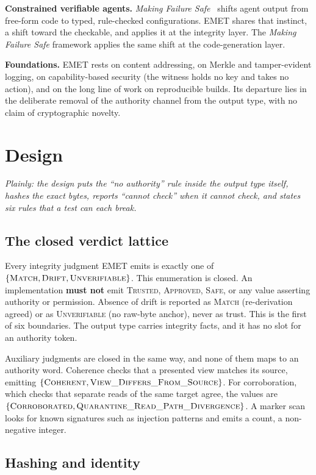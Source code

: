 \documentclass[11pt]{article}
\begin{document}
\textbf{Constrained verifiable agents.} \emph{Making Failure Safe}~\cite{mfsafe} shifts agent output from free-form code to typed, rule-checked configurations. EMET shares that instinct, a shift toward the checkable, and applies it at the integrity layer. The \emph{Making Failure Safe} framework applies the same shift at the code-generation layer.

\textbf{Foundations.} EMET rests on content addressing, on Merkle and tamper-evident logging, on capability-based security (the witness holds no key and takes no action), and on the long line of work on reproducible builds. Its departure lies in the deliberate removal of the authority channel from the output type, with no claim of cryptographic novelty.

\section{Design}
\label{sec:design}
\emph{Plainly: the design puts the ``no authority'' rule inside the output type itself, hashes the exact bytes, reports ``cannot check'' when it cannot check, and states six rules that a test can each break.}

\subsection{The closed verdict lattice}

Every integrity judgment EMET emits is exactly one of $\{\textsc{Match}, \textsc{Drift}, \textsc{Unverifiable}\}$. This enumeration is closed. An implementation \textbf{must not} emit \textsc{Trusted}, \textsc{Approved}, \textsc{Safe}, or any value asserting authority or permission. Absence of drift is reported as \textsc{Match} (re-derivation agreed) or as \textsc{Unverifiable} (no raw-byte anchor), never as trust. This is the first of six boundaries. The output type carries integrity facts, and it has no slot for an authority token.

Auxiliary judgments are closed in the same way, and none of them maps to an authority word. Coherence checks that a presented view matches its source, emitting $\{\textsc{Coherent}, \textsc{View\_Differs\_From\_Source}\}$. For corroboration, which checks that separate reads of the same target agree, the values are $\{\textsc{Corroborated}, \textsc{Quarantine\_Read\_Path\_Divergence}\}$. A marker scan looks for known signatures such as injection patterns and emits a count, a non-negative integer.

\subsection{Hashing and identity}
\end{document}
